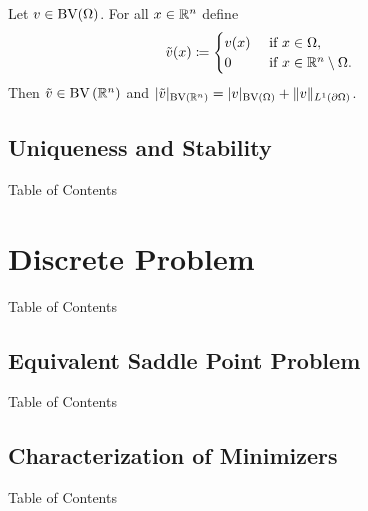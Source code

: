 \documentclass[xcolor=svgnames,english]{beamer}
\begin{document}
\begin{frame}
  
\end{frame}

\begin{frame}

  \bigbreak

  Let $v\in\textup{BV}(\Omega)$.
  For all $x\in\mathbb{R}^n$ define
  \begin{align*}
    \tilde{v}(x)\coloneqq
    \begin{cases}
      v(x)  &\text{ if } x\in\Omega,\\
      0     &\text{ if } x\in\mathbb{R}^n\setminus\Omega.
    \end{cases} 
  \end{align*}
  Then $\tilde{v}\in\textup{BV}\left(\mathbb{R}^n\right)$ and
  $|\tilde{v}|_{\textup{BV}\left(\mathbb{R}^n\right)}
  = |v|_{\textup{BV}(\Omega)}+\Vert v\Vert_{L^1(\partial\Omega)}$.
\end{frame}

\subsection{Uniqueness and Stability}
\begin{frame}{Table of Contents}
\end{frame}


\section{Discrete Problem}
\begin{frame}{Table of Contents}
\end{frame}

\subsection{Equivalent Saddle Point Problem}
\begin{frame}{Table of Contents}
\end{frame}
\subsection{Characterization of Minimizers}
\begin{frame}{Table of Contents}
\end{frame}
\end{document}
